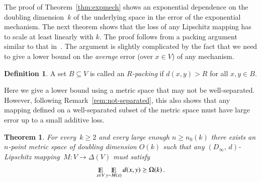 \documentclass[letterpaper,11pt]{article}
\newtheorem{theorem}{Theorem}[section]
\theoremstyle{definition}
\newtheorem{definition}{Definition}[section]
\renewcommand{\mathbb}{\varmathbb}
\newcommand{\Esymb}{\mathbb{E}}
\DeclareMathOperator*{\E}{\Esymb}
\newcommand{\mper}{\,.}
\newcommand\dtoDinfty{D_\infty,\, d}
\begin{document}
%
The proof of Theorem~\ref{thm:expmech} shows an exponential dependence on the doubling
dimension~$k$ of the underlying space in the error of the
exponential mechanism.
%
The next theorem shows that the loss of any Lipschitz mapping has
to scale at least linearly with $k.$ The proof follows from a packing argument
similar to that in~\cite{HardtTa10}.
The argument is slightly
complicated by the fact
that we need to give a lower bound on the \emph{average} error
(over $x\in V$) of any mechanism.
%
\begin{definition}
A set $B\subseteq V$ is called an \emph{$R$-packing} if $d(x,y)>R$
for all $x,y\in B.$
\end{definition}
%
Here we give a lower bound using a metric space that may not be
well-separated. However, following Remark~\ref{rem:not-separated},
this also shows that any mapping defined on a well-separated subset of the
metric space must have large error up to a small additive loss.
%
\begin{theorem}\label{thm:lb}
For every~$k\ge2$ and every large enough
$n\ge n_0(k)$ there exists an  $n$-point metric space of
doubling dimension $O(k)$ such that
any $(\dtoDinfty)$-Lipschitz mapping~$M\colon V\to\Delta(V)$ must satisfy
\[
\E_{x\in V}\E_{y\sim M(x)}d(x,y)\ge \Omega(k)\mper
\]
\end{theorem}
%
\end{document}
